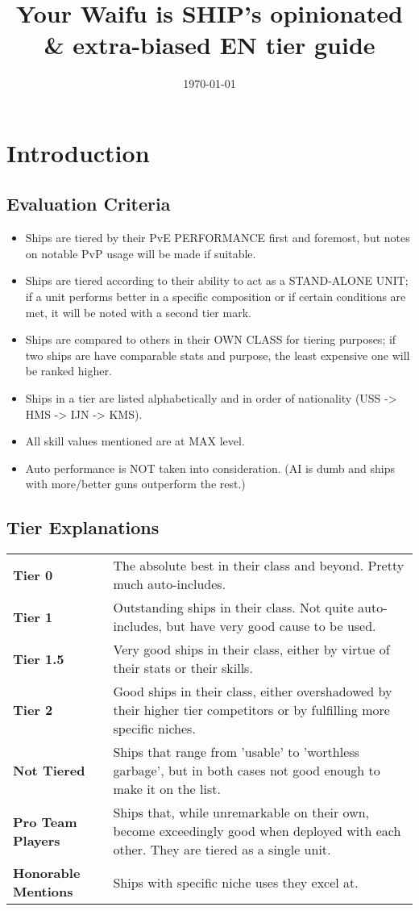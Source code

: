 \newcommand{\game}{Azur Lane EN}
\title{Your Waifu is SHIP's opinionated \& extra-biased EN tier guide} 
\newcommand{\subtitle}{based on Kopfjäger's work}
\date{\today}

\customtitle
\tableofcontents
\newpage
\pagestyle{intro}

\section{Introduction}
\subsection{Evaluation Criteria}
\begin{itemize}
\item Ships are tiered by their PvE PERFORMANCE first and foremost, but notes on notable PvP usage will be made if suitable.
\item Ships are tiered according to their ability to act as a STAND-ALONE UNIT; if a unit performs better in a specific composition or if certain conditions are met, it will be noted with a second tier mark.
\item Ships are compared to others in their OWN CLASS for tiering purposes; if two ships are have comparable stats and purpose, the least expensive one will be ranked higher.
\item Ships in a tier are listed alphabetically and in order of nationality (USS -> HMS -> IJN -> KMS).
\item All skill values mentioned are at MAX level.
\item Auto performance is NOT taken into consideration. (AI is dumb and ships with more/better guns outperform the rest.)
\end{itemize}


\subsection{Tier Explanations}
\renewcommand{\arraystretch}{1.3}
\begin{tabularx}{\textwidth}{>{\bfseries}lX}
    Tier 0              & The absolute best in their class and beyond. Pretty much auto-includes.\\
    Tier 1              & Outstanding ships in their class. Not quite auto-includes, but have very good cause to be used.\\
    Tier 1.5            & Very good ships in their class, either by virtue of their stats or their skills.\\
    Tier 2              & Good ships in their class, either overshadowed by their higher tier competitors or by fulfilling more specific niches.\\
    Not Tiered		& Ships that range from 'usable' to 'worthless garbage', but in both cases not good enough to make it on the list.\\
    Pro Team Players    & Ships that, while unremarkable on their own, become exceedingly good when deployed with each other. They are tiered as a single unit.\\
    Honorable Mentions  & Ships with specific niche uses they excel at.
\end{tabularx} 

